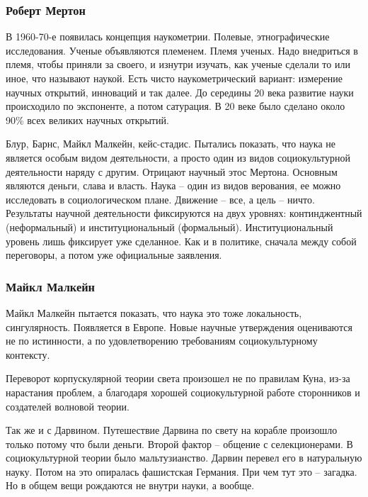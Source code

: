 \documentclass[a4paper, 12pt]{article}
\begin{document}
\subsubsection{Роберт Мертон}

В 1960-70-е появилась концепция наукометрии. Полевые, этнографические 
исследования. Ученые объявляются племенем. Племя ученых. Надо внедриться 
в племя, чтобы приняли за своего, и изнутри изучать, как ученые сделали 
то или иное, что называют наукой. Есть чисто наукометрический вариант: 
измерение научных открытий, инноваций и так далее. До середины 20 века 
развитие науки происходило по экспоненте, а потом сатурация. В 20 веке 
было сделано около 90\% всех великих научных открытий.


Блур, Барнс, Майкл Малкейн, кейс-стадис. Пытались показать, что наука не 
является особым видом деятельности, а просто один из видов 
социокультурной деятельности наряду с другим. Отрицают научный этос 
Мертона. Основным являются деньги, слава и власть. Наука -- один из 
видов верования, ее можно исследовать в социологическом плане. Движение 
-- все, а цель -- ничто. Результаты научной деятельности фиксируются на 
двух уровнях: континджентный (неформальный) и институциональный 
(формальный). Институциональный уровень лишь фиксирует уже сделанное. 
Как и в политике, сначала между собой переговоры, а потом уже 
официальные заявления.

\subsubsection{Майкл Малкейн}

Майкл Малкейн пытается показать, что наука это тоже локальность, 
сингулярность. Появляется в Европе. Новые научные утверждения 
оцениваются не по истинности, а по удовлетворению требованиям 
социокультурному контексту.

Переворот корпускулярной теории света произошел не по правилам Куна, 
из-за нарастания проблем, а благодаря хорошей социокультурной работе 
сторонников и создателей волновой теории.

Так же и с Дарвином. Путешествие Дарвина по свету на корабле произошло 
только потому что были деньги. Второй фактор -- общение 
с селекционерами. В социокультурной теории было мальтузианство. Дарвин 
перевел его в натуральную науку. Потом на это опиралась фашистская 
Германия. При чем тут это -- загадка. Но в общем вещи рождаются не 
внутри науки, а вообще.
\end{document}
